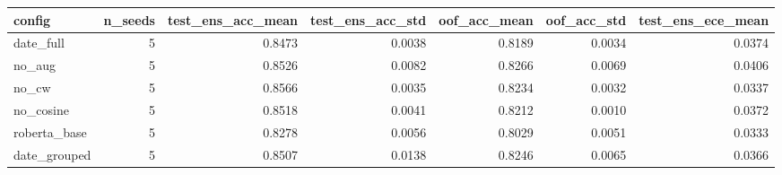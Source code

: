 \begin{tabular}{lrrrrrr}
\toprule
config & n_seeds & test_ens_acc_mean & test_ens_acc_std & oof_acc_mean & oof_acc_std & test_ens_ece_mean \\
\midrule
date_full & 5 & 0.8473 & 0.0038 & 0.8189 & 0.0034 & 0.0374 \\
no_aug & 5 & 0.8526 & 0.0082 & 0.8266 & 0.0069 & 0.0406 \\
no_cw & 5 & 0.8566 & 0.0035 & 0.8234 & 0.0032 & 0.0337 \\
no_cosine & 5 & 0.8518 & 0.0041 & 0.8212 & 0.0010 & 0.0372 \\
roberta_base & 5 & 0.8278 & 0.0056 & 0.8029 & 0.0051 & 0.0333 \\
date_grouped & 5 & 0.8507 & 0.0138 & 0.8246 & 0.0065 & 0.0366 \\
\bottomrule
\end{tabular}
